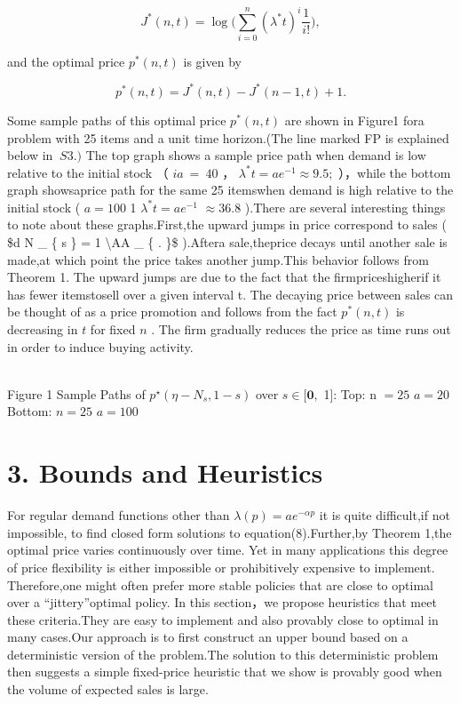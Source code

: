 \[
J ^ { * } ( n , t ) = \log \biggr ( \sum _ { i = 0 } ^ { n } ( \lambda ^ { * } t ) ^ { i } \frac { 1 } { i ! } \biggr ) ,
\]

and the optimal price \(p ^ { * } ( n , t )\) is given by

\[
p ^ { * } ( n , t ) = J ^ { * } ( n , t ) - J ^ { * } ( n - 1 , t ) + 1 .
\]

Some sample paths of this optimal price \(p ^ { * } ( n , t )\) are
shown in Figure1 fora problem with 25 items and a unit time horizon.(The
line marked FP is explained below in \(\ S 3 . )\) The top graph shows a
sample price path when demand is low relative to the initial stock （
\(\mathit { i a } \ = \ 4 0\) ，
\(\lambda ^ { * } t = a e ^ { - 1 } \approx 9 . 5 ;\) ），while the
bottom graph showsaprice path for the same 25 itemswhen demand is high
relative to the initial stock ( \(\mathit { a } = 1 0 0\) 1
\(\lambda ^ { * } t = a e ^ { - 1 }\) \(\approx 3 6 . 8 \dot { }\)
).There are several interesting things to note about these
graphs.First,the upward jumps in price correspond to sales ( {\$d N \_
\{ s \} = 1 \textbackslash AA \_ \{ . \}\$} ).Aftera sale,theprice
decays until another sale is made,at which point the price takes another
jump.This behavior follows from Theorem 1. The upward jumps are due to
the fact that the firmpriceshigherif it has fewer itemstosell over a
given interval t. The decaying price between sales can be thought of as
a price promotion and follows from the fact \(p ^ { * } ( n , t )\) is
decreasing in \(t\) for fixed \(n\) . The firm gradually reduces the
price as time runs out in order to induce buying activity.

\\
Figure 1 Sample Paths of \(p ^ { \star } ( \eta - N _ { s } , 1 - s )\)
over \(s \in [ \mathbf { 0 } ,\) 1{]}: Top: n \(= 2 5\) \(a = 2 0\)
Bottom: \(n = 2 5\) \(a = 1 0 0\)

\section{3. Bounds and Heuristics}\label{bounds-and-heuristics}

For regular demand functions other than
\(\lambda ( p ) = a e ^ { - \alpha p }\) it is quite difficult,if not
impossible, to find closed form solutions to equation(8).Further,by
Theorem 1,the optimal price varies continuously over time. Yet in many
applications this degree of price flexibility is either impossible or
prohibitively expensive to implement. Therefore,one might often prefer
more stable policies that are close to optimal over a ``jittery''optimal
policy. In this section，we propose heuristics that meet these
criteria.They are easy to implement and also provably close to optimal
in many cases.Our approach is to first construct an upper bound based on
a deterministic version of the problem.The solution to this
deterministic problem then suggests a simple fixed-price heuristic that
we show is provably good when the volume of expected sales is large.

